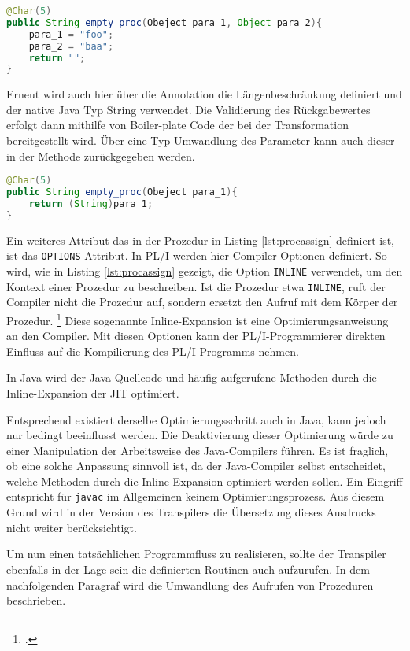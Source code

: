 \begin{lstlisting}[language=Java, caption=Java-Annotation für übersetze Prozeduren, label={lst:javaannotationproc}]
@Char(5)
public String empty_proc(Obeject para_1, Object para_2){
	para_1 = "foo";
	para_2 = "baa";
	return "";
}
\end{lstlisting} 

Erneut wird auch hier über die Annotation die Längenbeschränkung definiert und der native Java Typ String verwendet.
Die Validierung des Rückgabewertes erfolgt dann mithilfe von Boiler-plate Code der bei der Transformation bereitgestellt wird.
Über eine Typ-Umwandlung des Parameter kann auch dieser in der Methode zurückgegeben werden. 

\begin{lstlisting}[language=Java, caption=\"Ubersetzung der Prozedur, label={lst:metassign}]
@Char(5)
public String empty_proc(Obeject para_1){
	return (String)para_1;
}
\end{lstlisting} 

Ein weiteres Attribut das in der Prozedur in Listing \ref{lst:procassign} definiert ist, ist das \verb+OPTIONS+
Attribut.
In PL/I werden hier Compiler-Optionen definiert. So wird, wie in Listing \ref{lst:procassign} gezeigt, die Option \verb+INLINE+ verwendet, um den Kontext einer Prozedur zu beschreiben. Ist die Prozedur etwa \verb+INLINE+, ruft der Compiler nicht die Prozedur auf, sondern ersetzt den Aufruf mit dem Körper der Prozedur. \footcite[Vgl.][]{optionsstmt} Diese sogenannte Inline-Expansion ist eine Optimierungsanweisung an den Compiler. Mit diesen Optionen kann der PL/I-Programmierer direkten Einfluss auf die Kompilierung des PL/I-Programms nehmen.

In Java wird der Java-Quellcode und häufig aufgerufene Methoden durch die Inline-Expansion der \ac{JIT} optimiert.

Entsprechend existiert derselbe Optimierungsschritt auch in Java, kann jedoch nur bedingt beeinflusst werden. Die Deaktivierung dieser Optimierung würde zu einer Manipulation der Arbeitsweise des Java-Compilers führen. Es ist fraglich, ob eine solche Anpassung sinnvoll ist, da der Java-Compiler selbst entscheidet, welche Methoden durch die Inline-Expansion optimiert werden sollen. Ein Eingriff entspricht für \verb+javac+ im Allgemeinen keinem Optimierungsprozess.
Aus diesem Grund wird in der Version des Transpilers die Übersetzung dieses Ausdrucks nicht weiter berücksichtigt.


Um nun einen tatsächlichen Programmfluss zu realisieren, sollte der Transpiler ebenfalls in der Lage sein die definierten Routinen auch aufzurufen.
In dem nachfolgenden Paragraf wird die Umwandlung des Aufrufen von Prozeduren beschrieben.

